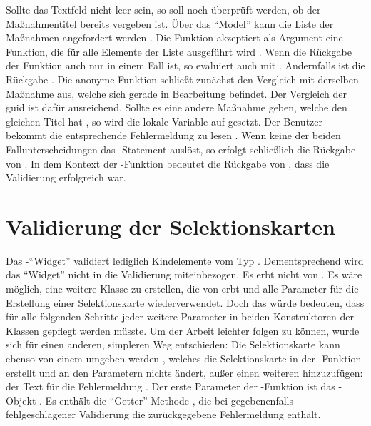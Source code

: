 Sollte das Textfeld nicht leer sein, so soll noch überprüft werden, ob der Maßnahmentitel bereits vergeben ist.
Über das \enquote{Model} kann die Liste der Maßnahmen angefordert werden .
Die Funktion  akzeptiert als Argument eine Funktion, die für alle Elemente der Liste ausgeführt wird .
Wenn die Rückgabe der Funktion auch nur in einem Fall  ist, so evaluiert auch  mit .
Andernfalls ist die Rückgabe . 
Die anonyme Funktion schließt zunächst den Vergleich mit derselben Maßnahme aus, welche sich gerade in Bearbeitung befindet.
Der Vergleich der guid ist dafür ausreichend.
Sollte es eine andere Maßnahme geben, welche den gleichen Titel hat , so wird die lokale Variable  auf  gesetzt.
Der Benutzer bekommt die entsprechende Fehlermeldung  zu lesen .
Wenn keine der beiden Fallunterscheidungen das -Statement  auslöst, so erfolgt schließlich die Rückgabe von .
In dem Kontext der -Funktion bedeutet die Rückgabe von  , dass die Validierung erfolgreich war.
 
\section{Validierung der Selektionskarten}
 
Das -\enquote{Widget} validiert lediglich Kindelemente vom Typ .
Dementsprechend wird das \enquote{Widget}  nicht in die Validierung miteinbezogen.
Es erbt nicht von .
Es wäre möglich, eine weitere Klasse zu erstellen, die von  erbt und alle Parameter für die Erstellung einer Selektionskarte wiederverwendet.
Doch das würde bedeuten, dass für alle folgenden Schritte jeder weitere Parameter in beiden Konstruktoren der Klassen gepflegt werden müsste.
Um der Arbeit leichter folgen zu können, wurde sich für einen anderen, simpleren Weg entschieden: 
Die Selektionskarte kann ebenso von einem  umgeben werden ,
welches die Selektionskarte in der -Funktion erstellt und an den Parametern nichts ändert,
außer einen weiteren hinzuzufügen: der Text für die Fehlermeldung .
Der erste Parameter der -Funktion ist das -Objekt .
Es enthält die \enquote{Getter}-Methode , die bei gegebenenfalls fehlgeschlagener Validierung die zurückgegebene Fehlermeldung enthält.

